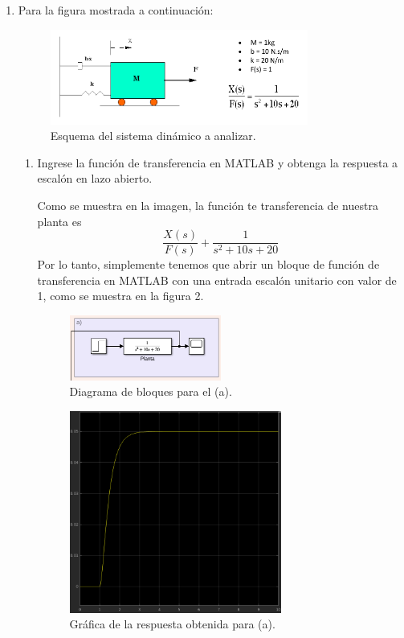 \documentclass[12pt, letterpaper]{article}
\begin{document}
\begin{enumerate}
	\item Para la figura mostrada a continuación:
		\begin{figure}[H]
			\centering
			\includegraphics[width=0.8\textwidth]{planta.png}
			\caption{Esquema del sistema dinámico a analizar.}
		\end{figure}
		\begin{enumerate}
			\item Ingrese la función de transferencia en MATLAB y obtenga la respuesta a escalón en lazo abierto.

				Como se muestra en la imagen, la función te transferencia de nuestra planta es
				\begin{equation}
					\frac{X(s)}{F(s)} + \frac{1}{s^2 + 10s + 20}
				\end{equation}
				Por lo tanto, simplemente tenemos que abrir un bloque de función de transferencia en MATLAB con una entrada escalón unitario con valor de 1, como se muestra en la figura 2.
				\begin{figure}[H]
					\centering
					\includegraphics[width=0.5\textwidth]{1a.png}
					\caption{Diagrama de bloques para el (a).}
				\end{figure}
				\begin{figure}[H]
					\centering
					\includegraphics[width=0.7\textwidth]{1aa.png}
					\caption{Gráfica de la respuesta obtenida para (a).}
				\end{figure}
			

\end{enumerate}
\end{enumerate}
\end{document}

